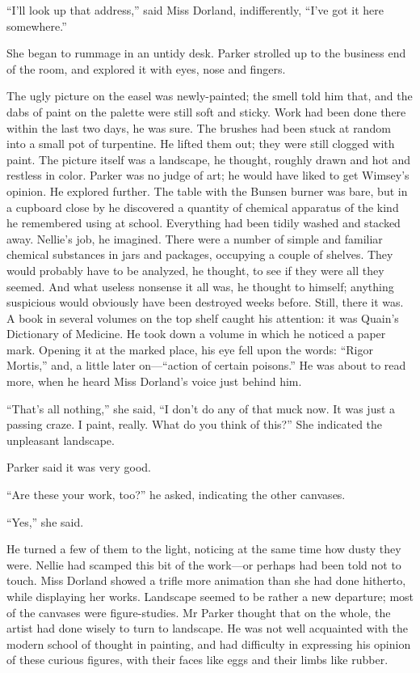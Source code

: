 \enquote{I'll look up that address,} said Miss Dorland, indifferently, \enquote{I've got it here somewhere.}

She began to rummage in an untidy desk. Parker strolled up to the business end of the room, and explored it with eyes, nose and fingers.

The ugly picture on the easel was newly-painted; the smell told him that, and the dabs of paint on the palette were still soft and sticky. Work had been done there within the last two days, he was sure. The brushes had been stuck at random into a small pot of turpentine. He lifted them out; they were still clogged with paint. The picture itself was a landscape, he thought, roughly drawn and hot and restless in color. Parker was no judge of art; he would have liked to get Wimsey's opinion. He explored further. The table with the Bunsen burner was bare, but in a cupboard close by he discovered a quantity of chemical apparatus of the kind he remembered using at school. Everything had been tidily washed and stacked away. Nellie's job, he imagined. There were a number of simple and familiar chemical substances in jars and packages, occupying a couple of shelves. They would probably have to be analyzed, he thought, to see if they were all they seemed. And what useless nonsense it all was, he thought to himself; anything suspicious would obviously have been destroyed weeks before. Still, there it was. A book in several volumes on the top shelf caught his attention: it was Quain's Dictionary of Medicine. He took down a volume in which he noticed a paper mark. Opening it at the marked place, his eye fell upon the words: \enquote{Rigor Mortis,} and, a little later on---\enquote{action of certain poisons.} He was about to read more, when he heard Miss Dorland's voice just behind him.

\enquote{That's all nothing,} she said, \enquote{I don't do any of that muck now. It was just a passing craze. I paint, really. What do you think of this?} She indicated the unpleasant landscape.

Parker said it was very good.

\enquote{Are these your work, too?} he asked, indicating the other canvases.

\enquote{Yes,} she said.

He turned a few of them to the light, noticing at the same time how dusty they were. Nellie had scamped this bit of the work\allowbreak---\allowbreak or perhaps had been told not to touch. Miss Dorland showed a trifle more animation than she had done hitherto, while displaying her works. Landscape seemed to be rather a new departure; most of the canvases were figure-studies. Mr Parker thought that on the whole, the artist had done wisely to turn to landscape. He was not well acquainted with the modern school of thought in painting, and had difficulty in expressing his opinion of these curious figures, with their faces like eggs and their limbs like rubber.

